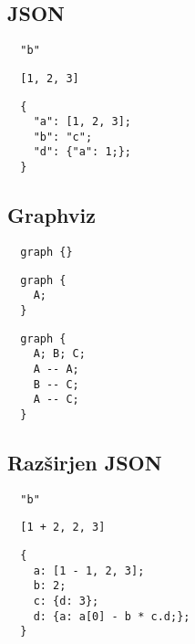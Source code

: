\documentclass{article}
\begin{document}
\subsection{JSON}
\begin{verbatim}
  "b"
\end{verbatim}
\begin{verbatim}
  [1, 2, 3]
\end{verbatim}
\begin{verbatim}
  {
    "a": [1, 2, 3];
    "b": "c";
    "d": {"a": 1;};
  }
\end{verbatim}

\subsection{Graphviz}
\begin{verbatim}
  graph {}
\end{verbatim}
\begin{verbatim}
  graph {
    A;
  }
\end{verbatim}
\begin{verbatim}
  graph {
    A; B; C;
    A -- A;
    B -- C;
    A -- C;
  }
\end{verbatim}

\subsection{Razširjen JSON}
\begin{verbatim}
  "b"
\end{verbatim}
\begin{verbatim}
  [1 + 2, 2, 3]
\end{verbatim}
\begin{verbatim}
  {
    a: [1 - 1, 2, 3];
    b: 2;
    c: {d: 3};
    d: {a: a[0] - b * c.d;};
  }
\end{verbatim}


\printbibliography
\end{document}
